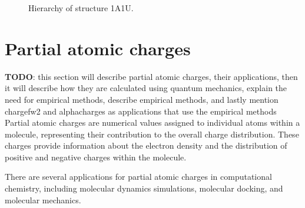 \documentclass[
  digital,     %
  oneside,     %
  nosansbold,  %
  nocolorbold, %
  lof,         %
  lot,         %
]{fithesis4}
\begin{document}
\begin{figure}[htbp]
  \centering
  \caption{Hierarchy of structure 1A1U.}
  \label{fig:partial_charges_color_theme}
\end{figure}


\section{Partial atomic charges}
\label{section:partial_atomic_charges}

\textbf{TODO}: this section will describe partial atomic charges, their applications, then it will describe how they are calculated using quantum mechanics, explain the need for empirical methods, describe empirical methods, and lastly mention chargefw2 and alphacharges as applications that use the empirical methods \\

Partial atomic charges are numerical values assigned to individual atoms within a molecule, representing their contribution to the overall charge distribution. These charges provide information about the electron density and the distribution of positive and negative charges within the molecule.

There are several applications for partial atomic charges in computational chemistry, including molecular dynamics simulations, molecular docking, and molecular mechanics.
\end{document}
